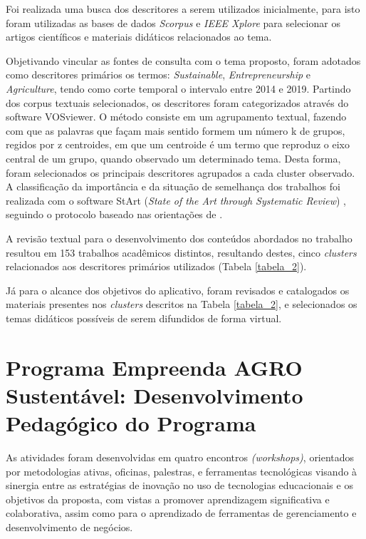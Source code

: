 Foi realizada uma busca dos descritores a serem utilizados inicialmente, para isto foram utilizadas as bases de dados \textit{Scorpus} e \textit{IEEE Xplore} para selecionar os artigos científicos e materiais didáticos relacionados ao tema.

Objetivando vincular as fontes de consulta com o tema proposto, foram adotados como descritores primários os termos: \textit{Sustainable}, \textit{Entrepreneurship} e \textit{Agriculture}, tendo como corte temporal o intervalo entre 2014 e 2019. Partindo dos corpus textuais selecionados, os descritores foram categorizados através do software VOSviewer. O método consiste em um agrupamento textual, fazendo com que as palavras que façam mais sentido formem um número k de grupos, regidos por z centroides, em que um centroide é um termo que reproduz o eixo central de um grupo, quando observado um determinado tema. Desta forma, foram selecionados os principais descritores agrupados a cada cluster observado. A classificação da importância e da situação de semelhança dos trabalhos foi realizada com o software StArt (\textit{State of the Art through Systematic Review}) \cite{lapes_start_2005}, seguindo o protocolo baseado nas orientações de . 

A revisão textual para o desenvolvimento dos conteúdos abordados no trabalho resultou em 153 trabalhos acadêmicos distintos, resultando destes, cinco \textit{clusters} relacionados aos descritores primários utilizados (Tabela \ref{tabela_2}). 

Já para o alcance dos objetivos do aplicativo, foram revisados e catalogados os materiais presentes nos \textit{clusters} descritos na Tabela \ref{tabela_2}, e selecionados os temas didáticos possíveis de serem difundidos de forma virtual.


\section{Programa Empreenda AGRO Sustentável: Desenvolvimento Pedagógico do Programa}

As atividades foram desenvolvidas em quatro encontros \textit{(workshops)}, orientados por metodologias ativas, oficinas, palestras, e ferramentas tecnológicas visando à sinergia entre as estratégias de inovação no uso de tecnologias educacionais e os objetivos da proposta, com vistas a promover aprendizagem significativa e colaborativa, assim como para o aprendizado de ferramentas de gerenciamento e desenvolvimento de negócios.

